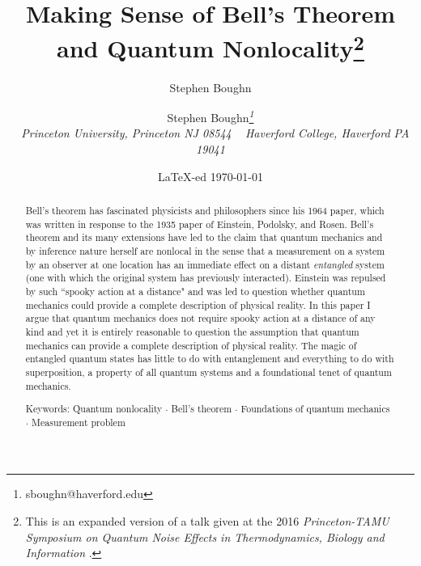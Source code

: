 \documentclass[12pt]{article}
\def\\{\hfill\break} \let\==\equiv
\begin{document}
\title{Making Sense of Bell's Theorem and Quantum Nonlocality\footnote{This is an expanded version of a talk given at the 2016 {\it Princeton-TAMU Symposium on Quantum Noise Effects in Thermodynamics, Biology and Information} \cite{Bou16}.}}
\author {Stephen Boughn{\small\it\thanks{sboughn@haverford.edu}}\author{Stephen Boughn}
\\[2mm]
~ \it Princeton University, Princeton NJ 08544 \\
~ \it Haverford College, Haverford PA 19041}

\date{{\small   \LaTeX-ed \today}}

\maketitle


\begin{abstract}
Bell's theorem has fascinated physicists and philosophers since his 1964 paper, which was written in response to the 1935 paper of Einstein, Podolsky, and Rosen. Bell's theorem and its many extensions have led to the claim that quantum mechanics and by inference nature herself are nonlocal in the sense that a measurement on a system by an observer at one location has an immediate effect on a distant {\it entangled} system (one with which the original system has previously interacted). Einstein was repulsed by such ``spooky action at a distance" and was led to question whether quantum mechanics could provide a complete description of physical reality. In this paper I argue that quantum mechanics does not require spooky action at a distance of any kind and yet it is entirely reasonable to question the assumption that quantum mechanics can provide a complete description of physical reality. The magic of entangled quantum states has little to do with entanglement and everything to do with superposition, a property of all quantum systems and a foundational tenet of quantum mechanics.

\\ {\small{Keywords: Quantum nonlocality $\cdot$ Bell's theorem $\cdot$ Foundations of quantum mechanics $\cdot$ Measurement problem}}

\end{abstract}

\maketitle
\end{document}
